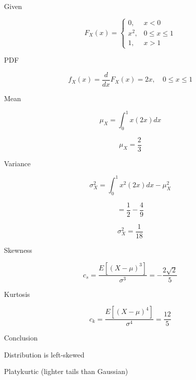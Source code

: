 \documentclass[12pt]{article}
\begin{document}
Given

\[
F_X(x)=
\begin{cases}
0, & x<0 \\
x^2, & 0\le x \le1 \\
1, & x>1
\end{cases}
\]

PDF

\[
f_X(x)=\frac{d}{dx}F_X(x)=2x,\quad 0\le x\le1
\]

Mean

\[
\mu_X=\int_0^1 x(2x)dx
\]

\[
\mu_X=\frac{2}{3}
\]

Variance

\[
\sigma_X^2=\int_0^1 x^2(2x)dx-\mu_X^2
\]

\[
=\frac{1}{2}-\frac{4}{9}
\]

\[
\sigma_X^2=\frac{1}{18}
\]

Skewness

\[
c_s=\frac{E[(X-\mu)^3]}{\sigma^3}=-\frac{2\sqrt{2}}{5}
\]

Kurtosis

\[
c_k=\frac{E[(X-\mu)^4]}{\sigma^4}=\frac{12}{5}
\]

Conclusion

Distribution is left-skewed

Platykurtic (lighter tails than Gaussian)
\end{document}
